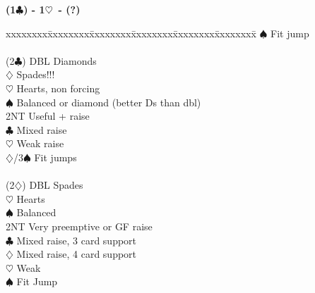\documentclass[10pt]{article}
\renewcommand{\c}{$\clubsuit$}
\renewcommand{\d}{$\diamondsuit$}
\newcommand{\h}{$\heartsuit$}
\newcommand{\s}{$\spadesuit$}
\newcommand{\x}{DBL}
\newenvironment{bidtable}[1][]
{\textbf{#1}
  \begin{adjustwidth}{1em}{}
    \addvspace{2pt}
    \begin{tabbing}
      xxxxxxxx\=xxxxxxxx\=xxxxxxxx\=xxxxxxxx\=xxxxxxxx\=xxxxxxxx\=\kill}
{\end{tabbing}\end{adjustwidth}\bigskip}%
\begin{document}
\begin{multicols*}{2}
\begin{bidtable}[(1\c) - 1\h\ - (?)]
       \s     \> Fit jump                            \\
                                                              \\
(2\c)  \> \x      \> Diamonds                                 \\
       \d     \> Spades!!!                                \\
       \h     \> Hearts, non forcing                      \\
       \s     \> Balanced or diamond (better Ds than dbl) \\
       \> 2NT     \> Useful + raise                           \\
       \c     \> Mixed raise                              \\
       \h     \> Weak raise                               \\
       \d/3\s \> Fit jumps                                \\
                                                              \\
(2\d)  \> \x     \> Spades                                   \\
       \h     \> Hearts                                   \\
       \s     \> Balanced                                 \\
       \> 2NT     \> Very preemptive or GF raise              \\
       \c     \> Mixed raise, 3 card support              \\
       \d     \> Mixed raise, 4 card support              \\
       \h     \> Weak                                     \\
       \s     \> Fit Jump
\end{bidtable}


\end{multicols*}
\end{document}
